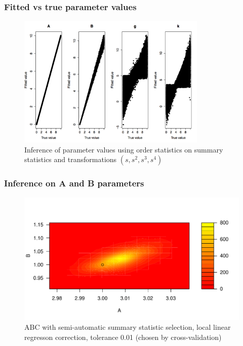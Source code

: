 \documentclass{beamer}
\begin{document}
\begin{frame}
\frametitle{Fitted vs true parameter values}
\begin{figure}
\includegraphics[width = \linewidth, height=2.5in]{fourthorder.png}
\caption{Inference of parameter values using order statistics on summary statistics and transformations $(s, s^2, s^3, s^4)$}
\end{figure}
\end{frame}


\begin{frame}
\frametitle{Inference on A and B parameters}
\begin{figure}
\includegraphics[width = \linewidth]{GK_REG_M_CONT_AB_SA.pdf}
\caption{ABC with semi-automatic summary statistic selection, local linear regresson correction, tolerance 0.01 (chosen by cross-validation)}
\end{figure}
\end{frame}
\end{document}
